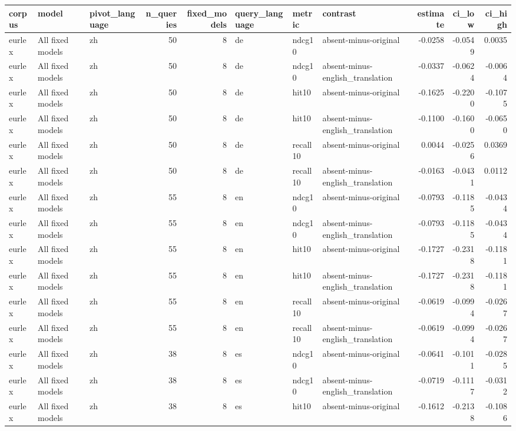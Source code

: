 \begin{tabular}{lllrrlllrrr}
\toprule
corpus & model & pivot\_language & n\_queries & fixed\_models & query\_language & metric & contrast & estimate & ci\_low & ci\_high \\
\midrule
eurlex & All fixed models & zh & 50 & 8 & de & ndcg10 & absent-minus-original & -0.0258 & -0.0549 & 0.0035 \\
eurlex & All fixed models & zh & 50 & 8 & de & ndcg10 & absent-minus-english\_translation & -0.0337 & -0.0624 & -0.0064 \\
eurlex & All fixed models & zh & 50 & 8 & de & hit10 & absent-minus-original & -0.1625 & -0.2200 & -0.1075 \\
eurlex & All fixed models & zh & 50 & 8 & de & hit10 & absent-minus-english\_translation & -0.1100 & -0.1600 & -0.0650 \\
eurlex & All fixed models & zh & 50 & 8 & de & recall10 & absent-minus-original & 0.0044 & -0.0256 & 0.0369 \\
eurlex & All fixed models & zh & 50 & 8 & de & recall10 & absent-minus-english\_translation & -0.0163 & -0.0431 & 0.0112 \\
eurlex & All fixed models & zh & 55 & 8 & en & ndcg10 & absent-minus-original & -0.0793 & -0.1185 & -0.0434 \\
eurlex & All fixed models & zh & 55 & 8 & en & ndcg10 & absent-minus-english\_translation & -0.0793 & -0.1185 & -0.0434 \\
eurlex & All fixed models & zh & 55 & 8 & en & hit10 & absent-minus-original & -0.1727 & -0.2318 & -0.1181 \\
eurlex & All fixed models & zh & 55 & 8 & en & hit10 & absent-minus-english\_translation & -0.1727 & -0.2318 & -0.1181 \\
eurlex & All fixed models & zh & 55 & 8 & en & recall10 & absent-minus-original & -0.0619 & -0.0994 & -0.0267 \\
eurlex & All fixed models & zh & 55 & 8 & en & recall10 & absent-minus-english\_translation & -0.0619 & -0.0994 & -0.0267 \\
eurlex & All fixed models & zh & 38 & 8 & es & ndcg10 & absent-minus-original & -0.0641 & -0.1011 & -0.0285 \\
eurlex & All fixed models & zh & 38 & 8 & es & ndcg10 & absent-minus-english\_translation & -0.0719 & -0.1117 & -0.0312 \\
eurlex & All fixed models & zh & 38 & 8 & es & hit10 & absent-minus-original & -0.1612 & -0.2138 & -0.1086 \\

\end{tabular}
